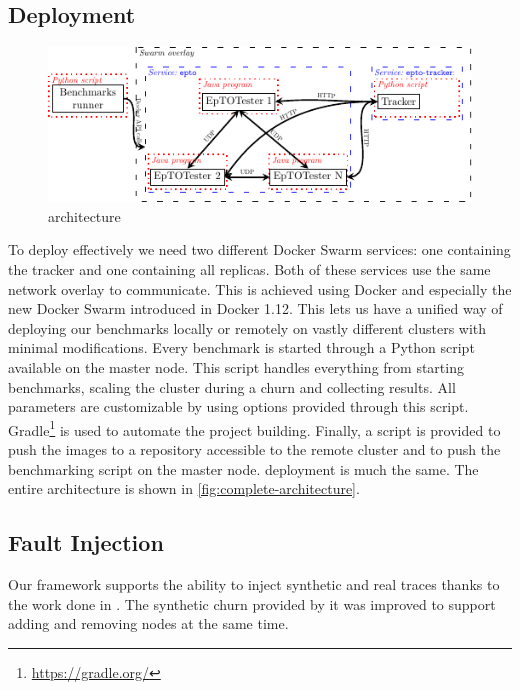 \subsection{Deployment}
 \begin{figure}[htp]
 	\centering
 	\includegraphics[width=\linewidth]{figures/complete-architecture.pdf}
 	\vspace{-2mm} 
 	\caption[Caption]{\eptotester architecture\footnotemark}
 	\vspace{-2mm} 
 	\label{fig:complete-architecture}
 \end{figure}
To deploy \epto effectively we need two different Docker Swarm services: one containing the tracker and one containing all \epto replicas. Both of these services use the same network overlay to communicate. This is achieved using Docker and especially the new Docker Swarm introduced in Docker 1.12. This lets us have a unified way of deploying our benchmarks locally or remotely on vastly different clusters with minimal modifications. Every benchmark is started through a Python script available on the master node. This script handles everything from starting benchmarks, scaling the cluster during a churn and collecting results. All \epto parameters are customizable by using options provided through this script.
Gradle\footnote{\href{https://gradle.org/}{https://gradle.org/}} is used to automate the project building. Finally, a script is provided to push the images to a repository accessible to the remote cluster and to push the benchmarking script on the master node. \jgroups deployment is much the same. The entire \eptotester architecture is shown in \autoref{fig:complete-architecture}.
\subsection{Fault Injection}
Our framework supports the ability to inject synthetic and real traces thanks to the work done in \autocite{vaucher2016erasure}. The synthetic churn provided by it was improved to support adding and removing nodes at the same time.
